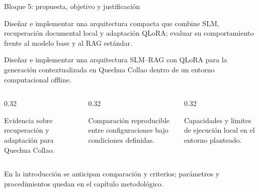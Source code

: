 \documentclass[aspectratio=169,10pt,spanish]{beamer}
\begin{document}
\begin{frame}{Bloque 5: propuesta, objetivo y justificación}
    \begin{tcolorbox}[colback=bpBlue!6,colframe=bpBlue,title=\textbf{Propuesta aplicada},fonttitle=\small\bfseries,top=0.8mm,bottom=0.8mm]
        \scriptsize Diseñar e implementar una arquitectura compacta que combine SLM,
        recuperación documental local y adaptación QLoRA; evaluar su comportamiento
        frente al modelo base y al RAG estándar.
    \end{tcolorbox}
    \begin{tcolorbox}[colback=bpLightGray,colframe=bpGold!90!black,title=\textbf{Objetivo general del plan, conservado},fonttitle=\small\bfseries,top=0.8mm,bottom=0.8mm]
        \scriptsize\centering
        Diseñar e implementar una arquitectura SLM--RAG con QLoRA para la generación
        contextualizada en Quechua Collao dentro de un entorno computacional offline.
    \end{tcolorbox}
    \begin{columns}[T,onlytextwidth]
        \begin{column}{0.32\textwidth}
            \begin{tcolorbox}[colback=white,colframe=bpBlue,title=\textbf{Ciencia},fonttitle=\scriptsize\bfseries,top=0.8mm,bottom=0.8mm]
                \tiny Evidencia sobre recuperación y adaptación para Quechua Collao.
            \end{tcolorbox}
        \end{column}
        \begin{column}{0.32\textwidth}
            \begin{tcolorbox}[colback=white,colframe=bpGold!90!black,title=\textbf{Método},fonttitle=\scriptsize\bfseries,top=0.8mm,bottom=0.8mm]
                \tiny Comparación reproducible entre configuraciones bajo condiciones definidas.
            \end{tcolorbox}
        \end{column}
        \begin{column}{0.32\textwidth}
            \begin{tcolorbox}[colback=white,colframe=bpRust,title=\textbf{Tecnología},fonttitle=\scriptsize\bfseries,top=0.8mm,bottom=0.8mm]
                \tiny Capacidades y límites de ejecución local en el entorno planteado.
            \end{tcolorbox}
        \end{column}
    \end{columns}
    \begin{tcolorbox}[colback=bpNavy,colframe=bpNavy,arc=1mm,top=0.8mm,bottom=0.8mm]
        \centering\tiny\color{white}
        En la introducción se anticipan comparación y criterios; parámetros y procedimientos quedan en el capítulo metodológico.
    \end{tcolorbox}
\end{frame}
\end{document}
